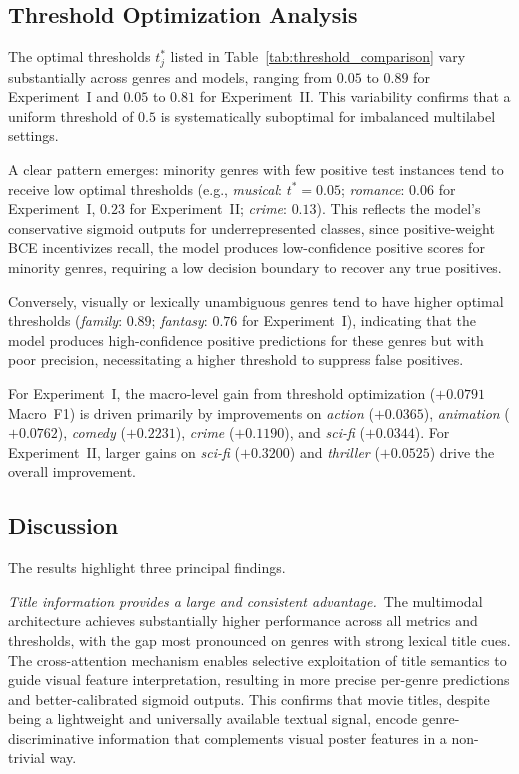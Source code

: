 \documentclass[conference]{IEEEtran}
\begin{document}
\subsection{Threshold Optimization Analysis}

The optimal thresholds $t^{*}_{j}$ listed in
Table~\ref{tab:threshold_comparison} vary substantially across genres
and models, ranging from $0.05$ to $0.89$ for Experiment~I and
$0.05$ to $0.81$ for Experiment~II. This variability confirms that
a uniform threshold of $0.5$ is systematically suboptimal for
imbalanced multilabel settings.

A clear pattern emerges: minority genres with few positive test
instances tend to receive low optimal thresholds (e.g.,
\textit{musical}: $t^{*} = 0.05$; \textit{romance}: $0.06$ for
Experiment~I, $0.23$ for Experiment~II; \textit{crime}: $0.13$).
This reflects the model's conservative sigmoid outputs for
underrepresented classes, since positive-weight BCE incentivizes
recall, the model produces low-confidence positive scores for
minority genres, requiring a low decision boundary to recover any
true positives.

Conversely, visually or lexically unambiguous genres tend to have
higher optimal thresholds (\textit{family}: $0.89$;
\textit{fantasy}: $0.76$ for Experiment~I), indicating that the
model produces high-confidence positive predictions for these
genres but with poor precision, necessitating a higher threshold
to suppress false positives.

For Experiment~I, the macro-level gain from threshold optimization
($+0.0791$ Macro~F1) is driven primarily by improvements on
\textit{action} ($+0.0365$), \textit{animation} ($+0.0762$),
\textit{comedy} ($+0.2231$), \textit{crime} ($+0.1190$), and
\textit{sci-fi} ($+0.0344$). For Experiment~II, larger gains on
\textit{sci-fi} ($+0.3200$) and \textit{thriller} ($+0.0525$)
drive the overall improvement.

\subsection{Discussion}

The results highlight three principal findings.

\textit{Title information provides a large and consistent advantage.}\
The multimodal architecture achieves substantially higher performance
across all metrics and thresholds, with the gap most pronounced on
genres with strong lexical title cues. The cross-attention mechanism
enables selective exploitation of title semantics to guide visual
feature interpretation, resulting in more precise per-genre
predictions and better-calibrated sigmoid outputs. This confirms
that movie titles, despite being a lightweight and universally
available textual signal, encode genre-discriminative information
that complements visual poster features in a non-trivial way.
\end{document}
